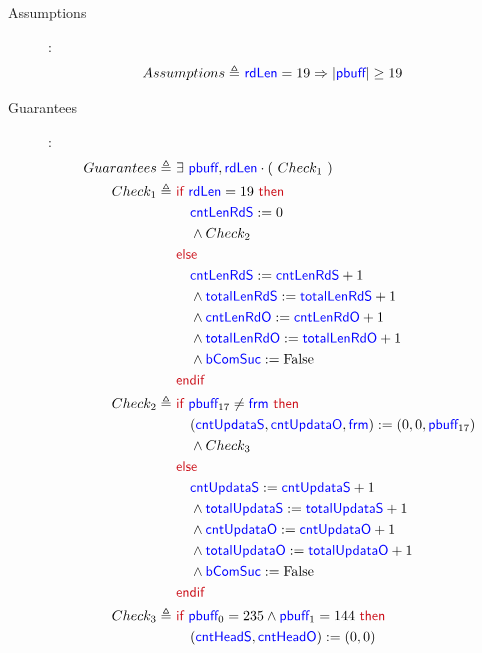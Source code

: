 \documentclass[fleqn,a4paper]{article}
\newcommand\Var[1]{\textcolor{blue}{\textsf{#1}}}
\newcommand\syntax[1]{\textcolor[RGB]{202,12,22}{\textsf{#1}}}
\newcommand\definedby{\triangleq}
\begin{document}
\begin{description}

\item[Assumptions]:
\begin{align*}
Assumptions \definedby \
& \Var{rdLen} = 19 \Rightarrow |\Var{pbuff}| \geq 19
\end{align*}

\item[Guarantees]:
\begin{align*}
Guarantees \definedby \
& \exists \ \Var{pbuff}, \Var{rdLen} \cdot ( \ Check_1 \ ) \\
Check_1 \definedby \
& \syntax{if } \Var{rdLen} = 19 \syntax{ then} \\
& \quad \Var{cntLenRdS} := 0 \\
& \quad \wedge Check_2 \\
& \syntax{else} \\
& \quad \Var{cntLenRdS} := \Var{cntLenRdS} + 1 \\
& \quad \wedge \Var{totalLenRdS} := \Var{totalLenRdS} + 1 \\
& \quad \wedge \Var{cntLenRdO} := \Var{cntLenRdO} + 1 \\
& \quad \wedge \Var{totalLenRdO} := \Var{totalLenRdO} + 1 \\
& \quad \wedge \Var{bComSuc} := \text{False} \\
& \syntax{endif} \\
Check_2 \definedby \
& \syntax{if } \Var{pbuff}_{17} \neq \Var{frm} \syntax{ then} \\
& \quad (\Var{cntUpdataS}, \Var{cntUpdataO}, \Var{frm}) := (0, 0, \Var{pbuff}_{17}) \\
& \quad \wedge Check_3 \\
& \syntax{else} \\
& \quad \Var{cntUpdataS} := \Var{cntUpdataS} + 1 \\
& \quad \wedge \Var{totalUpdataS} := \Var{totalUpdataS} + 1 \\
& \quad \wedge \Var{cntUpdataO} := \Var{cntUpdataO} + 1 \\
& \quad \wedge \Var{totalUpdataO} := \Var{totalUpdataO} + 1 \\
& \quad \wedge \Var{bComSuc} := \text{False} \\
& \syntax{endif} \\
Check_3 \definedby \
& \syntax{if } \Var{pbuff}_{0} = 235 \wedge \Var{pbuff}_{1} = 144 \syntax{ then} \\
& \quad (\Var{cntHeadS}, \Var{cntHeadO}) := (0, 0) \\

\end{align*}
\end{description}
\end{document}
